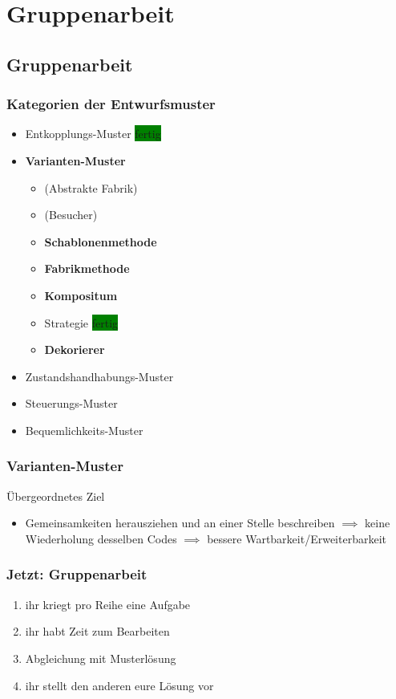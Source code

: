 \documentclass[18pt]{beamer}
\begin{document}
\section{Gruppenarbeit}
\subsection{Gruppenarbeit}
	\begin{frame}
		\frametitle{Kategorien der Entwurfsmuster}
		\begin{itemize}
			\item Entkopplungs-Muster \colorbox{green}{fertig}
			\item \textbf{Varianten-Muster}
			\begin{itemize}
				\item (Abstrakte Fabrik)
				\item (Besucher)
				\item \textbf{Schablonenmethode}
				\item \textbf{Fabrikmethode}
				\item \textbf{Kompositum}
				\item Strategie \colorbox{green}{fertig}
				\item \textbf{Dekorierer}
			\end{itemize}
			\item Zustandshandhabungs-Muster
			\item Steuerungs-Muster
			\item Bequemlichkeits-Muster
		\end{itemize}
	\end{frame}
	
	\begin{frame}
		\frametitle{Varianten-Muster}
		\begin{block}{Übergeordnetes Ziel}
			\begin{itemize}
				\item Gemeinsamkeiten herausziehen und an einer Stelle beschreiben \pause
				\linebreak $\implies$ keine Wiederholung desselben Codes \pause
				\linebreak $\implies$ bessere Wartbarkeit/Erweiterbarkeit		
			\end{itemize}
		\end{block}
	\end{frame}
	
	\begin{frame}
		\frametitle{Jetzt: Gruppenarbeit}
		\begin{enumerate}
			\item ihr kriegt pro Reihe eine Aufgabe
			\item ihr habt Zeit zum Bearbeiten
			\item Abgleichung mit Musterlösung
			\item ihr stellt den anderen eure Lösung vor
		\end{enumerate}
	\end{frame}
\end{document}
